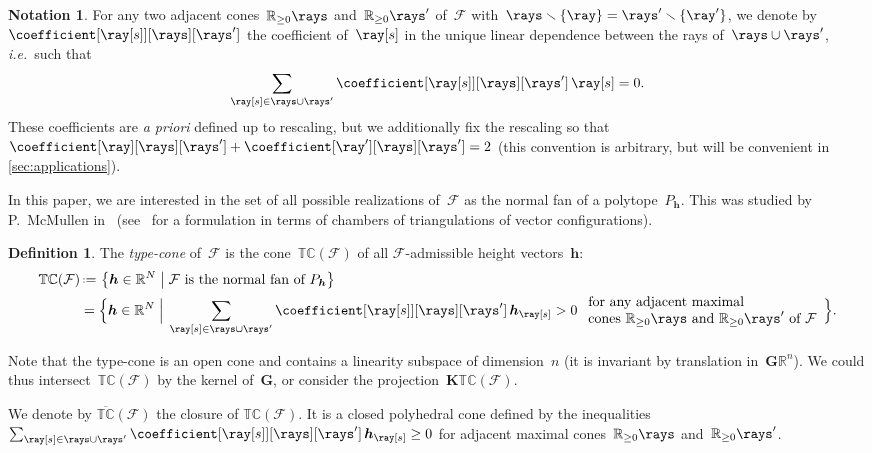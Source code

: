 \documentclass{amsart}
\theoremstyle{definition}
\newtheorem{definition}[theorem]{Definition}
\newtheorem{notation}[theorem]{Notation}
\newcommand{\R}{\mathbb{R}} %
\renewcommand{\b}[1]{{\boldsymbol{#1}}} %
\newcommand{\set}[2]{\left\{ #1 \;\middle|\; #2 \right\}} %
\newcommand{\Bigset}[2]{\Big\{ #1 \;\Big|\; #2 \Big\}} %
\newcommand{\ssm}{\smallsetminus} %
\newcommand{\eqdef}{\mbox{\,\raisebox{0.2ex}{\scriptsize\ensuremath{\mathrm:}}\ensuremath{=}\,}} %
\newcommand{\ie}{\textit{i.e.}~} %
\newcommand{\apriori}{\textit{a priori}} %
\newcommand{\darkblue}{\color{darkblue}} %
\newcommand{\defn}[1]{\textsl{\darkblue #1}} %
\newcommand{\Fan}{\mathcal{F}} %
\newcommand{\typeCone}{\mathbb{TC}} %
\newcommand{\ctypeCone}{\overline{\mathbb{TC}}} %
\begin{document}
\begin{notation}
For any two adjacent cones~$\R_{\ge0}\rays$ and~$\R_{\ge0}\rays'$ of~$\Fan$ with~$\rays \ssm \{\ray\} = \rays' \ssm \{\ray'\}$, we denote by~$\coefficient[{\ray[s]}][\rays][\rays']$ the coefficient of~$\ray[s]$ in the unique linear dependence between the rays of~$\rays \cup \rays'$, \ie such that
\[
\sum_{\ray[s] \in \rays \cup \rays'} \coefficient[{\ray[s]}][\rays][\rays'] \, \ray[s] = 0.
\]
These coefficients are \apriori{} defined up to rescaling, but we additionally fix the rescaling so that~${\coefficient[\ray][\rays][\rays'] + \coefficient[\ray'][\rays][\rays'] = 2}$ (this convention is arbitrary, but will be convenient in \cref{sec:applications}).
\end{notation}

In this paper, we are interested in the set of all possible realizations of~$\Fan$ as the normal fan of a polytope~$P_\b{h}$. This was studied by P.~McMullen in~\cite{McMullen-typeCone} (see~\cite[Sect.~9.5]{DeLoeraRambauSantos} for a formulation in terms of chambers of triangulations of vector configurations).

\begin{definition}\label{def:typecone}
The \defn{type-cone} of~$\Fan$ is the cone~$\typeCone(\Fan)$ of all $\Fan$-admissible height vectors~$\b{h}$:
\begin{align*}
\typeCone(\Fan) & \eqdef \set{\b{h} \in \R^N}{\Fan \text{ is the normal fan of } P_\b{h}} \\
& = \Bigset{\b{h} \in \R^N}{\sum_{\ray[s] \in \rays \cup \rays'} \coefficient[{\ray[s]}][\rays][\rays'] \, \b{h}_{\ray[s]} > 0 \; \begin{array}{l} \text{for any adjacent maximal} \\ \text{cones~$\R_{\ge0}\rays$ and~$\R_{\ge0}\rays'$ of~$\Fan$} \end{array}}.
\end{align*}
\end{definition}

Note that the type-cone is an open cone and contains a linearity subspace of dimension~$n$ (it is invariant by translation in~$\b{G} \R^n$). We could thus intersect~$\typeCone(\Fan)$ by the kernel of~$\b{G}$, or consider the projection~$\b{K}\typeCone(\Fan)$.

We denote by $\ctypeCone(\Fan)$ the closure of $\typeCone(\Fan)$. It is a closed polyhedral cone defined by the inequalities $\sum_{\ray[s] \in \rays \cup \rays'} \coefficient[{\ray[s]}][\rays][\rays'] \, \b{h}_{\ray[s]} \geq 0$ for adjacent maximal cones~$\R_{\ge0}\rays$ and~$\R_{\ge0}\rays'$.
\end{document}
